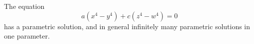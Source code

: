 \begin{proposition}
    The equation
\[
    a(x^4-y^4)+c(z^4-w^4)=0
\]
    has a parametric solution, and in general infinitely many parametric solutions in one parameter.
\end{proposition}
